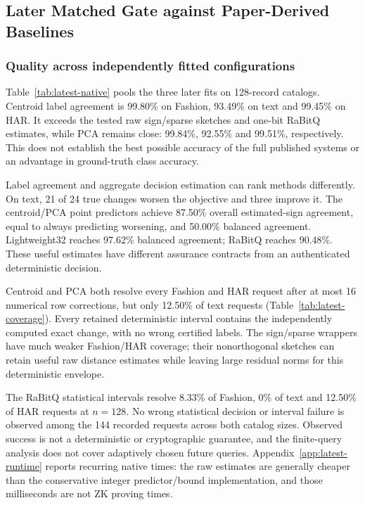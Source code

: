 \subsection{Later Matched Gate against Paper-Derived Baselines}
\label{sec:latest-gate}
\subsubsection{Quality across independently fitted configurations}
Table~\ref{tab:latest-native} pools the three later fits on 128-record
catalogs. Centroid label agreement is 99.80\% on Fashion, 93.49\% on text
and 99.45\% on HAR. It exceeds the tested raw sign/sparse sketches and
one-bit RaBitQ estimates, while PCA remains close: 99.84\%, 92.55\% and
99.51\%, respectively. This does not establish the best possible accuracy
of the full published systems or an advantage in ground-truth class accuracy.


Label agreement and aggregate decision estimation can rank methods
differently. On text, 21 of 24 true changes worsen the objective and three
improve it. The centroid/PCA point predictors achieve 87.50\% overall
estimated-sign agreement, equal to always predicting worsening, and
50.00\% balanced agreement. Lightweight32 reaches 97.62\% balanced
agreement; RaBitQ reaches 90.48\%. These useful estimates have different
assurance contracts from an authenticated deterministic decision.

Centroid and PCA both resolve every Fashion and HAR request after at most
16 numerical row corrections, but only 12.50\% of text requests
(Table~\ref{tab:latest-coverage}). Every retained deterministic interval
contains the independently computed exact change, with no wrong certified
labels. The sign/sparse wrappers have much weaker Fashion/HAR coverage;
their nonorthogonal sketches can retain useful raw distance estimates
while leaving large residual norms for this deterministic envelope.


The RaBitQ statistical intervals resolve 8.33\% of Fashion, 0\% of text
and 12.50\% of HAR requests at $n=128$. No wrong statistical decision or
interval failure is observed among the 144 recorded requests across both
catalog sizes. Observed success is not a deterministic or cryptographic
guarantee, and the finite-query analysis does not cover adaptively chosen
future queries. Appendix~\ref{app:latest-runtime} reports recurring native
times: the raw estimates are generally cheaper than the conservative
integer predictor/bound implementation, and those milliseconds are not
ZK proving times.

